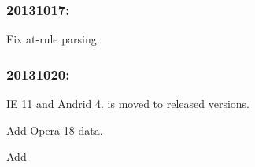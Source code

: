 \subsubsection*{20131017\+:}


\begin{DoxyItemize}
\item Fix  at-\/rule parsing.
\end{DoxyItemize}

\subsubsection*{20131020\+:}


\begin{DoxyItemize}
\item IE 11 and Andrid 4. is moved to released versions.
\item Add Opera 18 data.
\item Add 
\end{DoxyItemize}
